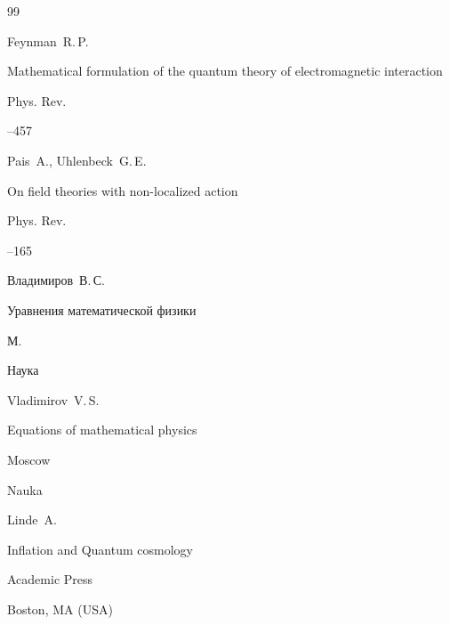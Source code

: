 \begin{thebibliography}{99}

\by  Feynman~R.\,P. 

\paper Mathematical formulation of the quantum theory of electromagnetic interaction


\jour Phys. Rev. 


–457 





\by Pais~A., Uhlenbeck~G.\,E.

\paper On field theories with non-localized action


\jour Phys. Rev. 


–165 







\by Владимиров~В.\,С. 

\book Уравнения математической физики

\publaddr М.

\publ Наука



\misctransl

\by Vladimirov~V.\,S.

\book Equations of mathematical physics

\publaddr Moscow 

\publ Nauka










\by  Linde~A.

\book Inflation and Quantum cosmology

\publ Academic Press

\publaddr Boston, MA (USA)









\end{thebibliography}





\hskip6.5cm \thedate \par

\hskip6.5cm\therevdate\par





\makeengtitle



\renewcommand{\baselinestretch}{0.9}



\newpage



%


